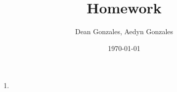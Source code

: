 \documentclass[twocolumn]{article}
\title{Homework }
\author{Dean Gonzales, Aedyn Gonzales}
\date{\today}
\begin{document}
\maketitle

\begin{enumerate}
    \item
\end{enumerate}
\end{document}
